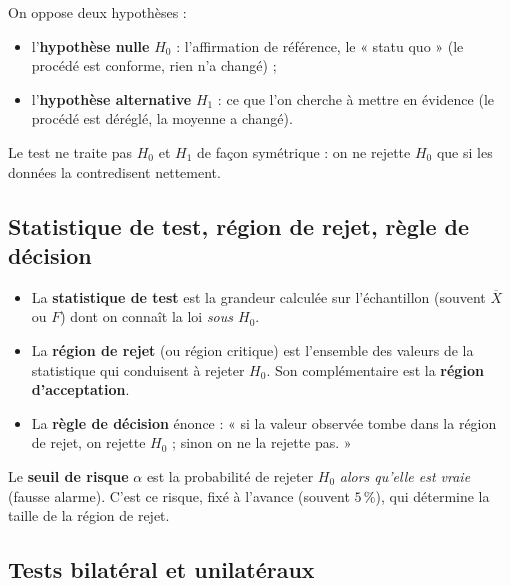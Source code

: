 \documentclass[a4paper,11pt]{article}
\begin{document}
\begin{definition}
On oppose deux hypothèses :
\begin{itemize}
  \item l'\textbf{hypothèse nulle} $H_0$ : l'affirmation de référence, le « statu quo » (le procédé est conforme, rien n'a changé) ;
  \item l'\textbf{hypothèse alternative} $H_1$ : ce que l'on cherche à mettre en évidence (le procédé est déréglé, la moyenne a changé).
\end{itemize}
Le test ne traite pas $H_0$ et $H_1$ de façon symétrique : on ne rejette $H_0$ que si les données la contredisent nettement.
\end{definition}

\subsection{Statistique de test, région de rejet, règle de décision}

\begin{definition}
\begin{itemize}
  \item La \textbf{statistique de test} est la grandeur calculée sur l'échantillon (souvent $\overline{X}$ ou $F$) dont on connaît la loi \emph{sous $H_0$}.
  \item La \textbf{région de rejet} (ou région critique) est l'ensemble des valeurs de la statistique qui conduisent à rejeter $H_0$. Son complémentaire est la \textbf{région d'acceptation}.
  \item La \textbf{règle de décision} énonce : « si la valeur observée tombe dans la région de rejet, on rejette $H_0$ ; sinon on ne la rejette pas. »
\end{itemize}
\end{definition}

\begin{definition}
Le \textbf{seuil de risque} $\alpha$ est la probabilité de rejeter $H_0$ \emph{alors qu'elle est vraie} (fausse alarme). C'est ce risque, fixé à l'avance (souvent $5\,\%$), qui détermine la taille de la région de rejet.
\end{definition}

\subsection{Tests bilatéral et unilatéraux}
\end{document}
